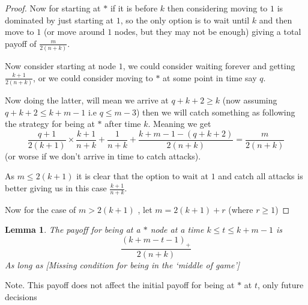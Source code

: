 \documentclass[a4paper,10pt]{article}
\newcommand{\pospart}[1]{\left( #1 \right)_{+}}
\newtheorem{lemma}[theorem]{Lemma}
\theoremstyle{definition}
\theoremstyle{definition}
\theoremstyle{remark}
\theoremstyle{definition}
\begin{document}
\begin{proof}
Now for starting at $*$ if it is before $k$ then considering moving to $1$ is dominated by just starting at $1$, so the only option is to wait until $k$ and then move to $1$ (or move around $1$ nodes, but they may not be enough) giving a total payoff of $\frac{m}{2(n+k)}$.

Now consider starting at node $1$, we could consider waiting forever and getting $\frac{k+1}{2(n+k)}$, or we could consider moving to $*$ at some point in time say $q$.

Now doing the latter, will mean we arrive at $q+k+2 \geq k$ (now assuming $q+k+2 \leq k+m-1$ i.e $q \leq m-3$) then we will catch something as following the strategy for being at $*$ after time $k$.
Meaning we get
$$\frac{q+1}{2(k+1)} \times \frac{k+1}{n+k}+\frac{1}{n+k}+\frac{k+m-1-(q+k+2)}{2(n+k)}=\frac{m}{2(n+k)}$$
(or worse if we don't arrive in time to catch attacks).

As $m \leq 2(k+1)$ it is clear that the option to wait at $1$ and catch all attacks is better giving us in this case $\frac{k+1}{n+k}$.

Now for the case of $m > 2(k+1)$ , let $m=2(k+1)+r$ (where $r \geq 1$)
\end{proof}

\begin{lemma}
The payoff for being at a $*$ node at a time $k \leq t \leq k+m-1$ is
$$\frac{\pospart{k+m-t-1}}{2(n+k)}$$
As long as [Missing condition for being in the `middle of game']
\end{lemma}
Note. This payoff does not affect the initial payoff for being at $*$ at $t$, only future decisions
\end{document}
